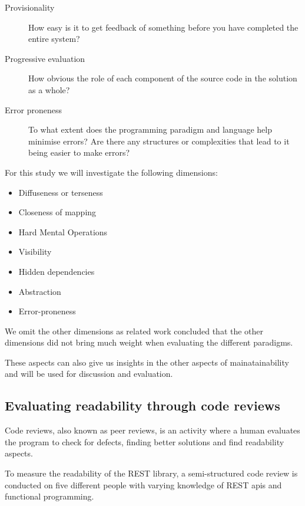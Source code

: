 \begin{description}
\item[ Provisionality ]

How easy is it to get feedback of something before you have completed the entire
system?

\item[ Progressive evaluation ]

How obvious the role of each component of the source code in the solution as a
whole?

\item[ Error proneness ]

To what extent does the programming paradigm and language help minimise errors? Are
there any structures or complexities that lead to it being easier to make
errors?
\end{description}

\noindent For this study we will investigate the following dimensions: 

\begin{itemize}
    \item Diffuseness or terseness
    \item Closeness of mapping
    \item Hard Mental Operations
    \item Visibility
    \item Hidden dependencies
    \item Abstraction
    \item Error-proneness 
\end{itemize}

\noindent We omit the other dimensions as related work concluded that the other
dimensions did not bring much weight when evaluating the different
paradigms.~\cite{euguenkiss}

These aspects can also give us insights in the other aspects of mainatainability
and will be used for discussion and evaluation.

\subsection{Evaluating readability through code reviews}

Code reviews, also known as peer reviews, is an activity where a human evaluates
the program to check for defects, finding better solutions and find readability
aspects. 

To measure the readability of the REST library, a semi-structured code review is
conducted on five different people with varying knowledge of REST apis and
functional programming.

